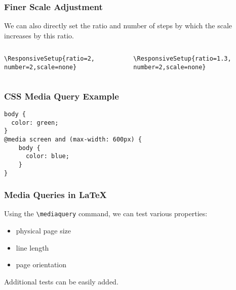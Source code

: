 \begin{frame}[fragile]
  \frametitle{Finer Scale Adjustment}

  We can also directly set the ratio and number of steps by which the scale increases by this ratio.

\begin{columns}
  \begin{column}{0.5\textwidth}
\begin{verbatim}
\ResponsiveSetup{ratio=2,
number=2,scale=none}
\end{verbatim}

\end{column}
  \begin{column}{0.5\textwidth}
\begin{verbatim}
\ResponsiveSetup{ratio=1.3,
number=2,scale=none}
\end{verbatim}

\end{column}
\end{columns}

\end{frame}

\begin{frame}[fragile]
\frametitle{CSS Media Query Example}
\begin{verbatim}
body {
  color: green;
}
@media screen and (max-width: 600px) {
    body {
      color: blue;
    }
}
\end{verbatim}
\end{frame}
          
\begin{frame}[fragile]
  \frametitle{Media Queries in \LaTeX}
    Using the \verb|\mediaquery| command, we can test various properties:
  
    \begin{itemize}
  \item physical page size
  \item line length
  \item page orientation
\end{itemize}

Additional tests can be easily added.

\end{frame}

